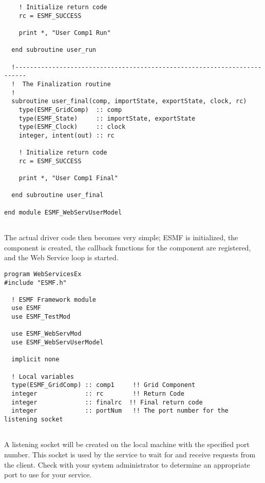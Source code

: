 \begin{verbatim}
    ! Initialize return code
    rc = ESMF_SUCCESS

    print *, "User Comp1 Run"

  end subroutine user_run

  !-------------------------------------------------------------------------
  !  The Finalization routine
  !  
  subroutine user_final(comp, importState, exportState, clock, rc)
    type(ESMF_GridComp)  :: comp
    type(ESMF_State)     :: importState, exportState
    type(ESMF_Clock)     :: clock
    integer, intent(out) :: rc

    ! Initialize return code
    rc = ESMF_SUCCESS

    print *, "User Comp1 Final"

  end subroutine user_final

end module ESMF_WebServUserModel
 
\end{verbatim}
 

    The actual driver code then becomes very simple; ESMF is initialized,
    the component is created, the callback functions for the component are
    registered, and the Web Service loop is started. 

 \begin{verbatim}
program WebServicesEx
#include "ESMF.h"

  ! ESMF Framework module
  use ESMF
  use ESMF_TestMod

  use ESMF_WebServMod
  use ESMF_WebServUserModel

  implicit none

  ! Local variables
  type(ESMF_GridComp) :: comp1     !! Grid Component
  integer             :: rc        !! Return Code
  integer             :: finalrc  !! Final return code
  integer             :: portNum   !! The port number for the listening socket
 
\end{verbatim}
 

    A listening socket will be created on the local machine with the specified
    port number.  This socket is used by the service to
    wait for and receive requests from the client.  Check with your system
    administrator to determine an appropriate port to use for your service. 

